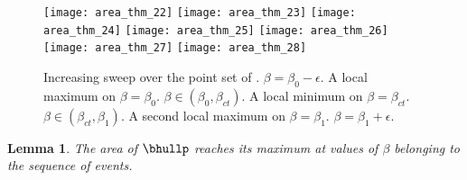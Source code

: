 \documentclass[11pt,letterpaper,english]{article}
\newtheorem{lemma}{Lemma}
\theoremstyle{definition}
\begin{document}
 \begin{figure}[ht]
    \centering
    \subcaptionbox{\label{apps:area:fig:bimodal_2:1}}
    {\texttt{[image: area\_thm\_22]}}
\hspace{-0.2cm}
    \subcaptionbox{\label{apps:area:fig:bimodal_2:2}}
    {\texttt{[image: area\_thm\_23]}}
\hspace{-0.2cm}
    \subcaptionbox{\label{apps:area:fig:bimodal_2:3}}
    {\texttt{[image: area\_thm\_24]}}
\hspace{-0.2cm}
    \subcaptionbox{\label{apps:area:fig:bimodal_2:4}}
    {\texttt{[image: area\_thm\_25]}}
\hspace{-0.2cm}
    \subcaptionbox{\label{apps:area:fig:bimodal_2:5}}
    {\texttt{[image: area\_thm\_26]}}
\hspace{-0.2cm}
    \subcaptionbox{\label{apps:area:fig:bimodal_2:6}}
    {\texttt{[image: area\_thm\_27]}}
\hspace{-0.2cm}
    \subcaptionbox{\label{apps:area:fig:bimodal_2:7}}
    {\texttt{[image: area\_thm\_28]}}
    \caption{Increasing sweep over the point set of
      . 
      $\beta=\beta_0-\epsilon$.  A
      local maximum on
      $\beta=\beta_0$. 
      $\beta\in(\beta_0,\beta_{ct})$. 
      A local minimum on
      $\beta=\beta_{ct}$. 
      $\beta\in(\beta_{ct},\beta_1)$. 
      A second local maximum on
      $\beta=\beta_1$. 
      $\beta=\beta_1+\epsilon$.}
    \label{apps:area:fig:bimodal_2}
  \end{figure}




\begin{lemma}\label{apps:area:lemma:events}
  The area of $\bhullp$ reaches its maximum at values of $\beta$
  belonging to the sequence of events.
\end{lemma}
\end{document}
